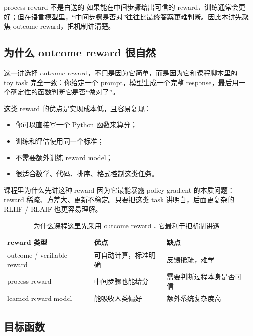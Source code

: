 \documentclass[a4paper]{article}
\begin{document}
\begin{warningbox}{process reward 不是白送的}
如果能在中间步骤给出可信的 reward，训练通常会更好；但在语言模型里，“中间步骤是否对”往往比最终答案更难判断。因此本讲先聚焦 outcome reward，把机制讲清楚。
\end{warningbox}

\subsection{为什么 outcome reward 很自然}

这一讲选择 outcome reward，不只是因为它简单，而是因为它和课程脚本里的 toy task 完全一致：你给定一个 prompt，模型生成一个完整 response，最后用一个确定性的函数判断它是否“做对了”。

这类 reward 的优点是实现成本低，且容易复现：
\begin{itemize}
    \item 你可以直接写一个 Python 函数来算分；
    \item 训练和评估使用同一个标准；
    \item 不需要额外训练 reward model；
    \item 很适合数学、代码、排序、格式控制这类任务。
\end{itemize}

\begin{importantbox}{课程里为什么先讲这种 reward}
因为它最能暴露 policy gradient 的本质问题：reward 稀疏、方差大、更新不稳定。只要把这类 task 讲明白，后面更复杂的 RLHF / RLAIF 也更容易理解。
\end{importantbox}

\begin{table}[H]
\centering
\begin{tabular}{@{}p{3.1cm}p{4.4cm}p{5.0cm}@{}}
\toprule
\textbf{reward 类型} & \textbf{优点} & \textbf{缺点} \\
\midrule
outcome / verifiable reward & 可自动计算，标准明确 & 反馈稀疏，难学 \\
process reward & 中间步骤也能给分 & 需要判断过程本身是否可信 \\
learned reward model & 能吸收人类偏好 & 额外系统复杂度高 \\
\bottomrule
\end{tabular}
\caption{为什么课程这里先采用 outcome reward：它最利于把机制讲透}
\end{table}

\subsection{目标函数}
\end{document}

